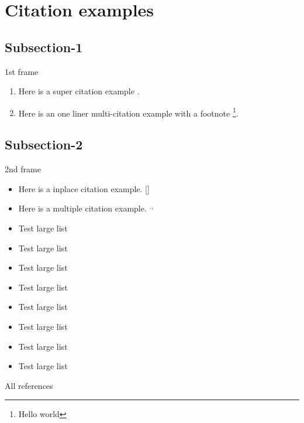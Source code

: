 \section{Citation examples}
\subsection{Subsection-1}
\begin{frame}{1st frame}
\begin{enumerate}

    \item Here is a super citation example \cite{Rubel2014, Nicklas2010}.
    \item Here is an one liner multi-citation example  with a footnote \renewcommand{\thefootnote}{\roman{footnote}}\footnote{Hello world}.
\end{enumerate}
\end{frame}

\subsection{Subsection-2}
\begin{frame}{2nd frame}
    \begin{itemize}
        \item Here is a inplace citation example. [{\scriptsize {}}]
        \item Here is a multiple citation example. $^,$$^,$
        \item Test large list
        \item Test large list
        \item Test large list
        \item Test large list
        \item Test large list
        \item Test large list
        \item Test large list
        \item Test large list
        
    \end{itemize}
\end{frame}

\begin{frame}{All references}
    \printbibliography[heading=bibnumbered]
\end{frame}